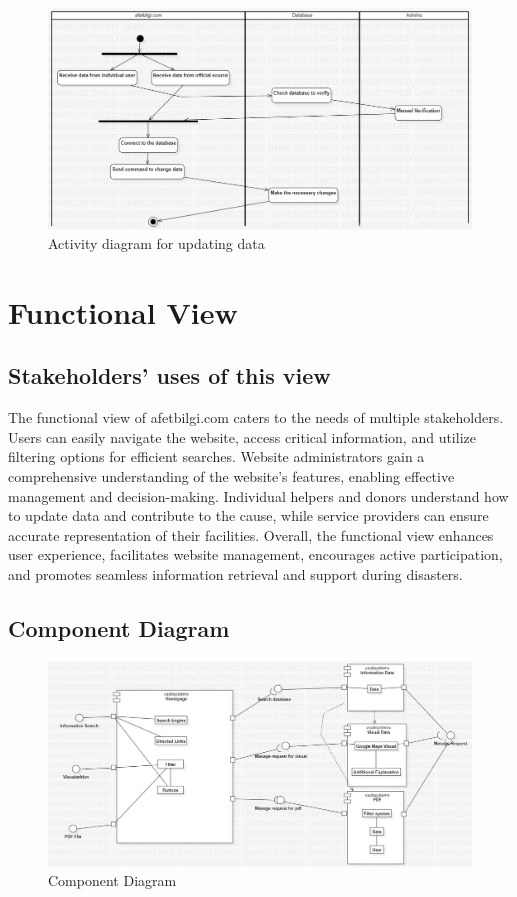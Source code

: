 \documentclass[12pt]{report}
\begin{document}
\begin{figure}[H]
    \includegraphics[scale=0.4]{act2.jpg}
    \centering
    \caption{Activity diagram for updating data}
\end{figure}

\section{Functional View}

\subsection{Stakeholders' uses of this view}
The functional view of afetbilgi.com caters to the needs of multiple stakeholders. Users can easily navigate the website, access critical information, 
and utilize filtering options for efficient searches. Website administrators gain a comprehensive understanding of the website's features, enabling 
effective management and decision-making. Individual helpers and donors understand how to update data and contribute to the cause, while service providers
can ensure accurate representation of their facilities. Overall, the functional view enhances user experience, facilitates website management, encourages 
active participation, and promotes seamless information retrieval and support during disasters.

\subsection{Component Diagram}
\begin{figure}[H]
    \includegraphics[scale=0.4]{component1.jpg}
    \centering
    \caption{Component Diagram}
\end{figure}
\end{document}
